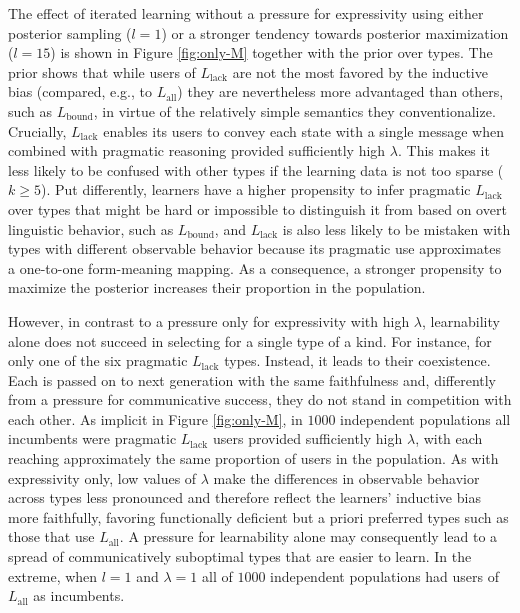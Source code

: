 \documentclass[a4paper]{article}
\newcommand{\mylang}[1]{\ensuremath{L_{\text{#1}}}\xspace} %
\newcommand{\Lall}{\mylang{all}}
\newcommand{\Lbound}{\mylang{bound}}
\newcommand{\Llack}{\mylang{lack}}
\begin{document}
The effect of iterated learning without a pressure for expressivity using either posterior sampling ($l = 1$) or a stronger tendency towards posterior maximization ($l = 15$) is shown in Figure \ref{fig:only-M} together with the prior over types. The prior shows that while users of $\Llack$ are not the most favored by the inductive bias (compared, e.g., to $\Lall$) they are nevertheless more advantaged than others, such as $\Lbound$, in virtue of the relatively simple semantics they conventionalize. Crucially, $\Llack$ enables its users to convey each state with a single message when combined with pragmatic reasoning provided sufficiently high $\lambda$. This makes it less likely to be confused with other types if the learning data is not too sparse ($k \geq 5$). Put differently, learners have a higher propensity to infer pragmatic $\Llack$ over types that might be hard or impossible to distinguish it from based on overt linguistic behavior, such as $\Lbound$, and $\Llack$ is also less likely to be mistaken with types with different observable behavior because its pragmatic use approximates a one-to-one form-meaning mapping. As a consequence, a stronger propensity to maximize the posterior increases their proportion in the population. 

However, in contrast to a pressure only for expressivity with high $\lambda$, learnability alone does not succeed in selecting for a single type of a kind. For instance, for only one of the six pragmatic $\Llack$ types. Instead, it leads to their coexistence. Each is passed on to next generation with the same faithfulness and, differently from a pressure for communicative success, they do not stand in competition with each other. As implicit in Figure \ref{fig:only-M}, in $1000$ independent populations all incumbents were pragmatic $\Llack$ users provided sufficiently high $\lambda$, with each reaching approximately the same proportion of users in the population. As with expressivity only, low values of $\lambda$ make the differences in observable behavior across types less pronounced and therefore reflect the learners' inductive bias more faithfully, favoring functionally deficient but a priori preferred types such as those that use $\Lall$. A pressure for learnability alone may consequently lead to a spread of communicatively suboptimal types that are easier to learn. In the extreme, when $l = 1$ and $\lambda = 1$ all of $1000$ independent populations had users of $\Lall$ as incumbents.
\end{document}
